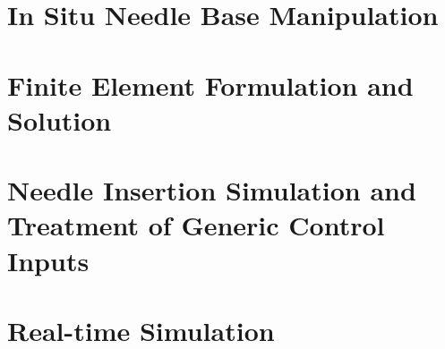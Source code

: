 \section{In Situ Needle Base Manipulation}
\label{sec:in_situ_needle_base_manipulation}

\section{Finite Element Formulation and Solution}
\label{sec:finite_element_formulation_and_solution}

\section{Needle Insertion Simulation and Treatment of Generic Control Inputs}
\label{sec:simulation_and_inputs}


\section{Real-time Simulation}
\label{sec:realtime_simulation}


